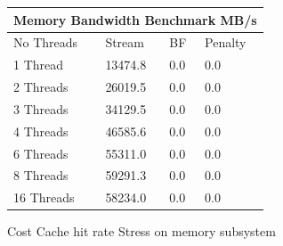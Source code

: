 \begin{tabular}{ |p{3cm}||p{3cm}|p{3cm}|p{3cm}|  }
 \hline
 \multicolumn{4}{|c|}{Memory Bandwidth Benchmark MB/s} \\
 \hline
  No Threads & Stream & BF & Penalty\\
 \hline
 1 Thread & 13474.8 & 0.0 & 0.0\\
 2 Threads & 26019.5 & 0.0 & 0.0\\
 3 Threads & 34129.5 & 0.0 & 0.0\\
 4 Threads & 46585.6 & 0.0 & 0.0\\
 6 Threads & 55311.0 & 0.0 & 0.0\\
 8 Threads & 59291.3 & 0.0 & 0.0\\
 16 Threads & 58234.0 & 0.0 & 0.0\\
 \hline
\end{tabular}

Cost
Cache hit rate
Stress on memory subsystem
